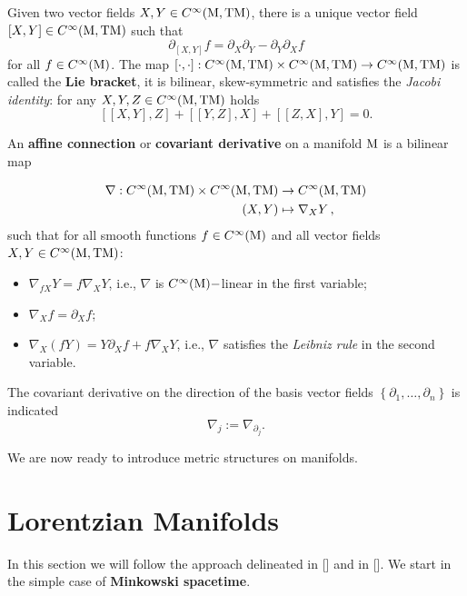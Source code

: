 \begin{oss}
	Given two vector fields $X,Y\in C^\infty(\mathrm{M},\mathrm{T}\mathrm{M})$, there is a unique vector field $[X,Y]\in C^\infty(\mathrm{M},\mathrm{T}\mathrm{M})$ such that
	\[		\partial_{[X,Y]}f=\partial_X\partial_Y-\partial_Y\partial_X f \]
	for all $f\in C^\infty(\mathrm{M})$. The map $[\cdot,\cdot ]:C^\infty(\mathrm{M},\mathrm{T}\mathrm{M})\times C^\infty(\mathrm{M},\mathrm{T}\mathrm{M})\to C^\infty(\mathrm{M},\mathrm{T}\mathrm{M})$ is called the \textbf{Lie bracket}, it is bilinear, skew-symmetric and satisfies the \emph{Jacobi identity}: for any $X,Y,Z\in C^\infty(\mathrm{M},\mathrm{T}\mathrm{M})$ holds
	\[	\left[[X,Y],Z\right]+\left[[Y,Z],X\right]+\left[[Z,X],Y\right]=0.		\]
\end{oss}

\begin{definition}
	An \textbf{affine connection} or \textbf{covariant derivative} on a manifold $\mathrm{M}$ is a bilinear map
	
	\[\begin{split}
	\nabla: C^\infty(\mathrm{M},\mathrm{T}\mathrm{M})\times C^\infty(\mathrm{M},\mathrm{T}\mathrm{M}) & \rightarrow C^\infty(\mathrm{M},\mathrm{T}\mathrm{M})\\
	(X,Y) & \mapsto \nabla_X Y\,,
	\end{split} \]
	such that for all smooth functions $f\in C^\infty(\mathrm{M})$ and all vector fields $X,Y\in C^\infty(\mathrm{M},\mathrm{T}\mathrm{M})$:
	\begin{itemize}
		\item 	$\nabla_{fX}Y= f\nabla_X Y$, i.e., $\nabla$ is $C^\infty(\mathrm{M})-$linear in the first variable;
		\item $\nabla_Xf=\partial_X f$;
		\item $\nabla_X (fY) = Y\partial_X f+ f\nabla_X Y$, i.e., $\nabla$ satisfies the \emph{Leibniz rule} in the second variable.
	\end{itemize}
\label{defn:connection}
\end{definition}

\noindent The covariant derivative on the direction of the basis vector fields $\left\{\partial_1,\dots,\partial_n\right\}$ is indicated
\[	\nabla_{j}:=\nabla_{\partial_j}.	\]



\noindent We are now ready to introduce metric structures on manifolds.

\section{Lorentzian Manifolds}

In this section we will follow the approach delineated in [\citealp{pfaffle}] and in [\citealp[Ch. 1]{bar2}]. We start in the simple case of \textbf{Minkowski spacetime}.

